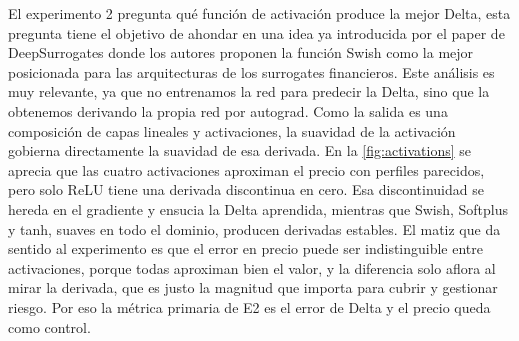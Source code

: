 \documentclass[11pt,a4paper]{article}
\begin{document}
El experimento 2 pregunta qué función de activación produce la mejor Delta, esta pregunta tiene el objetivo de ahondar en una idea ya introducida por el paper de DeepSurrogates \cite{chen2025} donde los autores proponen la función Swish como la mejor posicionada para las arquitecturas de los surrogates financieros. Este análisis es muy relevante, ya que no entrenamos la red para predecir la Delta, sino que la obtenemos derivando la propia red por autograd. Como la salida es una composición de capas lineales y activaciones, la suavidad de la activación gobierna directamente la suavidad de esa derivada. En la \autoref{fig:activations} se aprecia que las cuatro activaciones aproximan el precio con perfiles parecidos, pero solo ReLU tiene una derivada discontinua en cero. Esa discontinuidad se hereda en el gradiente y ensucia la Delta aprendida, mientras que Swish, Softplus y tanh, suaves en todo el dominio, producen derivadas estables. El matiz que da sentido al experimento es que el error en precio puede ser indistinguible entre activaciones, porque todas aproximan bien el valor, y la diferencia solo aflora al mirar la derivada, que es justo la magnitud que importa para cubrir y gestionar riesgo. Por eso la métrica primaria de E2 es el error de Delta y el precio queda como control.

\newpage
\end{document}
